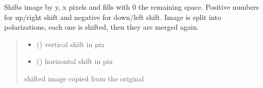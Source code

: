 \documentclass[letterpaper,10pt,english]{sphinxmanual}
\begin{document}
\begin{fulllineitems}
\begin{fulllineitems}
\end{fulllineitems}


\begin{fulllineitems}
\label{\detokenize{micropolarray:micropolarray.micropol_image.MicropolImage.shift}}
\pysigstartsignatures
{}
\pysigstopsignatures
\sphinxAtStartPar
Shifts image by y, x pixels and fills with 0 the remaining space. Positive numbers for up/right shift and negative for down/left shift. Image is split into polarizations, each one is shifted, then they are merged again.
\begin{quote}\begin{description}
\begin{itemize}
\item {} 
\sphinxAtStartPar
{} () \textendash{} vertical shift in pix

\item {} 
\sphinxAtStartPar
{} () \textendash{} horizontal shift in pix

\end{itemize}

\sphinxAtStartPar
shifted image copied from the original

\sphinxAtStartPar
{\hyperref[\detokenize{micropolarray:micropolarray.micropol_image.MicropolImage}]{}}

\end{description}\end{quote}

\end{fulllineitems}



\end{fulllineitems}
\end{document}

